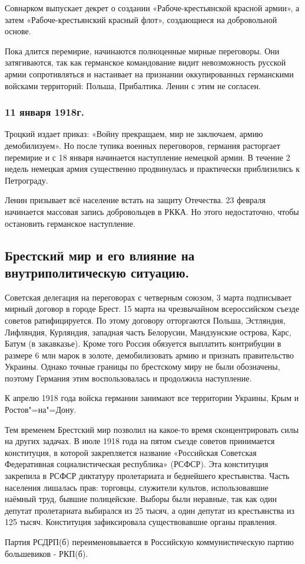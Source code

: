 Совнарком выпускает декрет о создании «Рабоче-крестьянской красной армии», а затем «Рабоче-крестьянский красный флот», создающиеся на добровольной основе.

Пока длится перемирие, начинаются полноценные мирные переговоры. Они затягиваются, так как германское командование видит невозможность русской армии сопротивляться и настаивает на признании оккупированных германскими войсками территорий: Польша, Прибалтика. Ленин с этим не согласен.

\subsubsection{\textbf{11 января 1918г.}}

Троцкий издает приказ: «Войну прекращаем, мир не заключаем, армию демобилизуем». Но после тупика военных переговоров, германия расторгает перемирие и с 18 января начинается наступление немецкой армии. В течение 2 недель немецкая армия существенно продвинулась и практически приблизились к Петрограду.

Ленин призывает всё население встать на защиту Отечества. 23 февраля начинается массовая запись добровольцев в РККА. Но этого недостаточно, чтобы остановить германское наступление.

\subsection{Брестский мир и его влияние на внутриполитическую ситуацию.}

Советская делегация на переговорах с четверным союзом, 3 марта подписывает мирный договор в городе Брест. 15 марта на чрезвычайном всероссийском съезде советов ратифицируется. По этому договору отторгаются Польша, Эстляндия, Лифляндия, Курляндия, западная часть Белорусии, Мандзунские острова, Карс, Батум (в закавказье). Кроме того Россия обязуется выплатить контрибуции в размере 6 млн марок в золоте, демобилизовать армию и признать правительство Украины. Однако точные границы по брестскому миру не были обозначены, поэтому Германия этим воспользовалась и продолжила наступление.

К апрелю 1918 года войска германии занимают все территории Украины, Крым и Ростов"=на"=Дону.

Тем временем Брестский мир позволил на какое-то время сконцентрировать силы на других задачах. В июле 1918 года на пятом съезде советов принимается конституция, в которой закрепляется название «Российская Советская Федеративная социалистическая республика» (РСФСР). Эта конституция закрепила в РСФСР диктатуру пролетариата и беднейшего крестьянства. Часть населения лишалась прав: торговцы, служители культов, использовавшие наёмный труд, бывшие полицейские. Выборы были неравные, так как один депутат пролетариата выбирался из 25 тысяч, а один депутат из крестьянства из 125 тысяч. Конституция зафиксировала существовавшие органы правления.

Партия РСДРП(б) переименовывается в Российскую коммунистическую партию большевиков - РКП(б).
